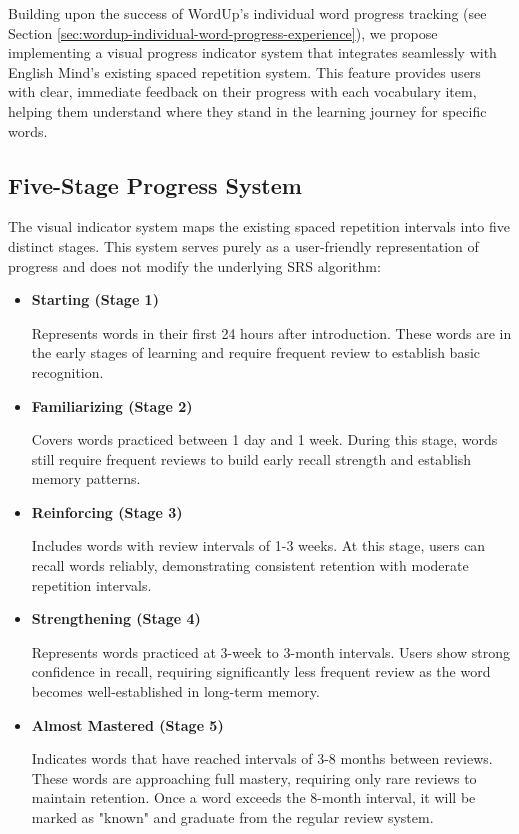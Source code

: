 Building upon the success of WordUp's individual word progress tracking (see Section \ref{sec:wordup-individual-word-progress-experience}), we propose implementing a visual progress indicator system that integrates seamlessly with English Mind's existing spaced repetition system. This feature provides users with clear, immediate feedback on their progress with each vocabulary item, helping them understand where they stand in the learning journey for specific words.

\subsection*{Five-Stage Progress System}

The visual indicator system maps the existing spaced repetition intervals into five distinct stages. This system serves purely as a user-friendly representation of progress and does not modify the underlying SRS algorithm:


\begin{itemize}
    \item \textbf{Starting (Stage 1)}
    
    Represents words in their first 24 hours after introduction. These words are in the early stages of learning and require frequent review to establish basic recognition.
    
    \item \textbf{Familiarizing (Stage 2)}
    
    Covers words practiced between 1 day and 1 week. During this stage, words still require frequent reviews to build early recall strength and establish memory patterns.
    
    \item \textbf{Reinforcing (Stage 3)}
    
    Includes words with review intervals of 1-3 weeks. At this stage, users can recall words reliably, demonstrating consistent retention with moderate repetition intervals.
    
    \item \textbf{Strengthening (Stage 4)}
    
    Represents words practiced at 3-week to 3-month intervals. Users show strong confidence in recall, requiring significantly less frequent review as the word becomes well-established in long-term memory.
    
    \item \textbf{Almost Mastered (Stage 5)}
    
    Indicates words that have reached intervals of 3-8 months between reviews. These words are approaching full mastery, requiring only rare reviews to maintain retention. Once a word exceeds the 8-month interval, it will be marked as "known" and graduate from the regular review system.
\end{itemize}


